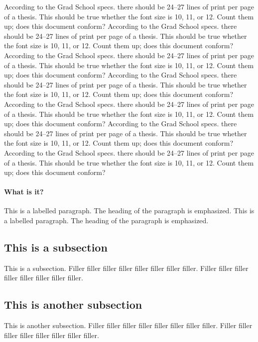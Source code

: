 According to the Grad School specs.   there should be 24--27 lines
of print per page of a thesis.  This should be true whether the font
size is 10, 11, or 12.  Count them up; does this document conform?
According to the Grad School specs.   there should be 24--27 lines
of print per page of a thesis.  This should be true whether the font
size is 10, 11, or 12.  Count them up; does this document conform?
According to the Grad School specs.   there should be 24--27 lines
of print per page of a thesis.  This should be true whether the font
size is 10, 11, or 12.  Count them up; does this document conform?
According to the Grad School specs.   there should be 24--27 lines
of print per page of a thesis.  This should be true whether the font
size is 10, 11, or 12.  Count them up; does this document conform?
According to the Grad School specs.   there should be 24--27 lines
of print per page of a thesis.  This should be true whether the font
size is 10, 11, or 12.  Count them up; does this document conform?
According to the Grad School specs.   there should be 24--27 lines
of print per page of a thesis.  This should be true whether the font
size is 10, 11, or 12.  Count them up; does this document conform?
According to the Grad School specs.   there should be 24--27 lines
of print per page of a thesis.  This should be true whether the font
size is 10, 11, or 12.  Count them up; does this document conform?


\paragraph{What is it?}
This is a labelled paragraph.
The heading of the paragraph is emphasized.
This is a labelled paragraph.
The heading of the paragraph is emphasized.

\subsection{This is a subsection}

This is a subsection.
Filler filler filler filler filler filler filler filler.
Filler filler filler filler filler filler filler filler.

\subsection{This is another subsection}

This is another subsection.
Filler filler filler filler filler filler filler filler.
Filler filler filler filler filler filler filler filler.

